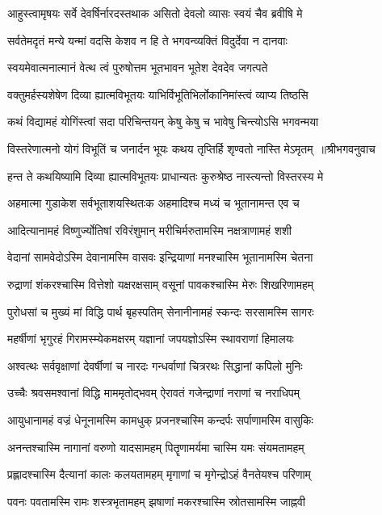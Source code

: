 \twolineshloka
{आहुस्त्वामृषयः सर्वे देवर्षिर्नारदस्तथाक}
{असितो देवलो व्यासः स्वयं चैव ब्रवीषि मे}


\twolineshloka
{सर्वतेमदृतं मन्ये यन्मां वदसि केशव}
{न हि ते भगवन्व्यक्तिं विदुर्देवा न दानवाः}


\twolineshloka
{स्वयमेवात्मनात्मानं वेत्थ त्वं पुरुषोत्तम}
{भूतभावन भूतेश देवदेव जगत्पते}


\twolineshloka
{वक्तुमर्हस्यशेषेण दिव्या ह्यात्मविभूतयः}
{याभिर्विभूतिभिर्लोकानिमांस्त्वं व्याप्य तिष्ठसि}


\twolineshloka
{कथं विद्यामहं योगिंस्त्वां सदा परिचिन्तयन्}
{केषु केषु च भावेषु चिन्त्योऽसि भगवन्मया}


\threelineshloka
{विस्तरेणात्मनो योगं विभूतिं च जनार्दन}
{भूयः कथय तृप्तिर्हि शृण्वतो नास्ति मेऽमृतम् ॥श्रीभगवनुवाच}
{}


\twolineshloka
{हन्त ते कथयिष्यामि दिव्या ह्यात्मविभूतयः}
{प्राधान्यतः कुरुश्रेष्ठ नास्त्यन्तो विस्तरस्य मे}


\twolineshloka
{अहमात्मा गुडाकेश सर्वभूताशयस्थितःक}
{अहमादिश्च मध्यं च भूतानामन्त एव च}


\twolineshloka
{आदित्यानामहं विष्णुर्ज्योतिषां रविरंशुमान्}
{मरीचिर्मरुतामस्मि नक्षत्राणामहं शशी}


\twolineshloka
{वेदानां सामवेदोऽस्मि देवानामस्मि वासवः}
{इन्द्रियाणां मनश्चास्मि भूतानामस्मि चेतना}


\twolineshloka
{रुद्राणां शंकरश्चास्मि वित्तेशो यक्षरक्षसाम्}
{वसूनां पावकश्चास्मि मेरुः शिखरिणामहम्}


\twolineshloka
{पुरोधसां च मुख्यं मां विद्धि पार्थ बृहस्पतिम्}
{सेनानीनामहं स्कन्दः सरसामस्मि सागरः}


\twolineshloka
{महर्षीणां भृगुरहं गिरामस्म्येकमक्षरम्}
{यज्ञानां जपयज्ञोऽस्मि स्थावराणां हिमालयः}


\twolineshloka
{अश्वत्थः सर्ववृक्षाणां देवर्षीणां च नारदः}
{गन्धर्वाणां चित्ररथः सिद्धानां कपिलो मुनिः}


\twolineshloka
{उच्चैः श्रवसमश्वानां विद्धि माममृतोद्भवम्}
{ऐरावतं गजेन्द्राणां नराणां च नराधिपम्}


\twolineshloka
{आयुधानामहं वज्रं धेनूनामस्मि कामधुक्}
{प्रजनश्चास्मि कन्दर्पः सर्पाणामस्मि वासुकिः}


\twolineshloka
{अनन्तश्चास्मि नागानां वरुणो यादसामहम्}
{पितॄणामर्यमा चास्मि यमः संयमतामहम्}


\twolineshloka
{प्रह्लादश्चास्मि दैत्यानां कालः कलयतामहम्}
{मृगाणां च मृगेन्द्रोऽहं वैनतेयश्च परिणाम्}


\twolineshloka
{पवनः पवतामस्मि रामः शस्त्रभृतामहम्}
{झषाणां मकरश्चास्मि स्रोतसामस्मि जाह्नवी}



